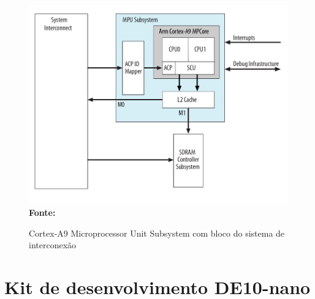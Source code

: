 \begin{figure}[ht]
	\caption{Cortex-A9 Microprocessor Unit Subsystem com bloco do sistema de interconexão}
	\begin{center}
		\includegraphics[scale=0.37]{imagens/mpusubsystem.png}\\
		{\small \textbf{Fonte:} }
    \end{center}\label{fig:mpusubsystem}
\end{figure}


\section{Kit de desenvolvimento DE10-nano}